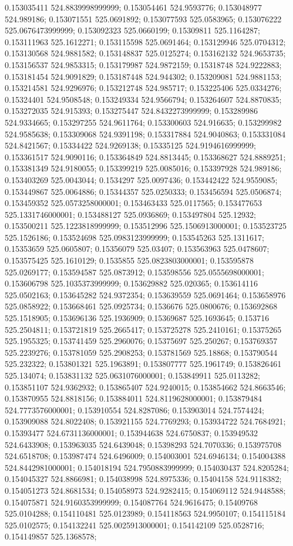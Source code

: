 0.153035411 524.8839998999999; 0.153054461 524.9593776; 0.153048977 524.989186; 0.153071551 525.0691892; 0.153077593 525.0583965; 0.153076222 525.0676473999999; 0.153092323 525.0660199; 0.15309811 525.1164287; 0.153111963 525.1612271; 0.153115598 525.0691464; 0.153129946 525.0704312; 0.153130568 524.9881582; 0.153148837 525.0125274; 0.153162132 524.9653735; 0.153156537 524.9853315; 0.153179987 524.9872159; 0.15318748 524.9222883; 0.153181454 524.9091829; 0.153187448 524.944302; 0.153209081 524.9881153; 0.153214581 524.9296976; 0.153212748 524.985717; 0.153225406 525.0334276; 0.15324401 524.9508548; 0.153249334 524.9566794; 0.153264607 524.8870835; 0.153272035 524.915393; 0.153275447 524.8432273999999; 0.153289986 524.9334665; 0.153297255 524.9611764; 0.153300603 524.916635; 0.153299982 524.9585638; 0.153309068 524.9391198; 0.153317884 524.9040863; 0.153331084 524.8421567; 0.15334422 524.9269138; 0.15335125 524.9194616999999; 0.153361517 524.9090116; 0.153364849 524.8813445; 0.153368627 524.8889251; 0.153381349 524.9180055; 0.153399219 525.0085016; 0.153397928 524.989186; 0.153403269 525.0043044; 0.1534297 525.0097436; 0.153442422 524.9559085; 0.153449867 525.0064886; 0.15344357 525.0250333; 0.153456594 525.0506874; 0.153459352 525.0573258000001; 0.153463433 525.0117565; 0.153477653 525.1331746000001; 0.153488127 525.0936869; 0.153497804 525.12932; 0.153500211 525.1223818999999; 0.153512996 525.1506913000001; 0.153523725 525.1526186; 0.153524698 525.0983123999999; 0.153545263 525.1311617; 0.15353659 525.0605807; 0.15356079 525.03407; 0.153563963 525.0478607; 0.153575425 525.1610129; 0.1535855 525.0823803000001; 0.153595878 525.0269177; 0.153594587 525.0873912; 0.153598556 525.0555698000001; 0.153606798 525.1035373999999; 0.153629882 525.020365; 0.153614116 525.0502163; 0.153645282 524.9372354; 0.153639559 525.0691464; 0.153658976 525.0858922; 0.153668461 525.0925734; 0.1536676 525.0800676; 0.153692868 525.1518905; 0.153696136 525.1936909; 0.15369687 525.1693645; 0.153716 525.2504811; 0.153721819 525.2665417; 0.153725278 525.2410161; 0.15375265 525.1955325; 0.153741459 525.2960076; 0.15375697 525.250267; 0.153769357 525.2239276; 0.153781059 525.2908253; 0.153781569 525.18868; 0.153790544 525.232322; 0.153801321 525.1963891; 0.153807777 525.1961749; 0.153826461 525.134074; 0.153831132 525.0631076000001; 0.153849911 525.0113282; 0.153851107 524.9362932; 0.153865407 524.9240015; 0.153854662 524.8663546; 0.153870955 524.8818156; 0.153884011 524.8119628000001; 0.153879484 524.7773576000001; 0.153910554 524.8287086; 0.153903014 524.7574424; 0.153909088 524.8022408; 0.153921155 524.7769293; 0.153934722 524.7684921; 0.15393477 524.6731136000001; 0.153944638 524.6750837; 0.153949532 524.6433908; 0.153963035 524.6439048; 0.15398293 524.7070336; 0.153975708 524.6518708; 0.153987474 524.6496009; 0.154003001 524.6946134; 0.154004388 524.8442981000001; 0.154018194 524.7950883999999; 0.154030437 524.8205284; 0.154045327 524.8866981; 0.154038998 524.8975336; 0.15404158 524.9118382; 0.154051273 524.8681534; 0.154058973 524.9282415; 0.154069112 524.9448588; 0.154075871 524.9160353999999; 0.154087764 524.9616475; 0.15409768 525.0104288; 0.154110481 525.0123989; 0.154118563 524.9950107; 0.154115184 525.0102575; 0.154132241 525.0025913000001; 0.154142109 525.0528716; 0.154149857 525.1368578; 